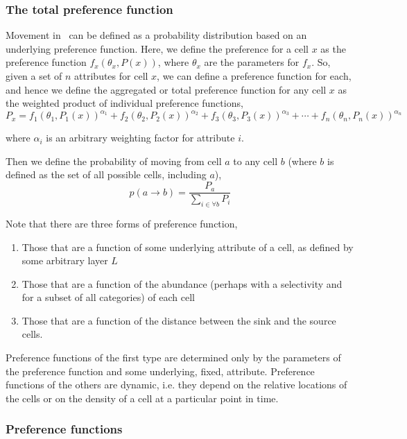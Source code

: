 \subsubsection*{The total preference function}

Movement in \SPM\ can be defined as a probability distribution based on an underlying preference function. Here, we define the preference for a cell $x$ as the preference function $f_x(\theta_x,P(x))$, where $\theta_x$ are the parameters for $f_x$. So, given a set of $n$ attributes for cell $x$, we can define a preference function for each, and hence we define the aggregated or total preference function for any cell $x$ as the weighted product of individual preference functions,
\begin{equation}
  P_x=f_1(\theta_1,P_1(x))^{\alpha_1} + f_2(\theta_2,P_2(x))^{\alpha_2} + f_3(\theta_3,P_3(x))^{\alpha_3} + \cdots + f_n(\theta_n,P_n(x))^{\alpha_n}
\end{equation}

where $\alpha_i$ is an arbitrary weighting factor for attribute $i$.

Then we define the probability of moving from cell $a$ to any cell $b$ (where $b$ is defined as the set of all possible cells, including $a$),
\begin{equation}
  p(a\rightarrow b) = \frac{P_a}{\sum\limits_{i \in \forall b} P_i}
\end{equation}

Note that there are three forms of preference function,
\begin{enumerate}
\item Those that are a function of some underlying attribute of a cell, as defined by some arbitrary layer $L$
\item Those that are a function of the abundance (perhaps with a selectivity and for a subset of all categories) of each cell
\item Those that are a function of the distance between the sink and the source cells. 
\end{enumerate} 

Preference functions of the first type are determined only by the parameters of the preference function and some underlying, fixed, attribute. Preference functions of the others are dynamic, i.e. they depend on the relative locations of the cells or on the density of a cell at a particular point in time.

\subsubsection*{Preference functions}

